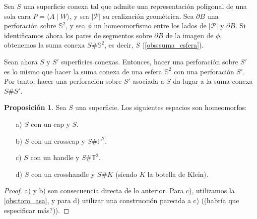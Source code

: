 \documentclass[10pt]{report}
\newcommand{\Esfera}{\mathbb{S}^2}
\newcommand{\Toro}{\mathbb{T}^2}
\newcommand{\Proyectivo}{\mathbb{P}^2}
\theoremstyle{definition}
\newtheorem{prop}[defin]{Proposición}
\begin{document}
Sea $S$ una superficie conexa tal que admite una representación poligonal de una sola cara $P=\langle A\mid W\rangle$, y sea $|\mathcal{P}|$ su realización geométrica. Sea $\partial B$ una perforación sobre $\Esfera$, y sea $\phi$ un homeomorfismo entre los lados de $|\mathcal{P}|$ y $\partial B$. Si identificamos ahora los pares de segmentos sobre $\partial B$ de la imagen de $\phi$, obtenemos la suma conexa $S\# \Esfera$, es decir, $S$ (\autoref{obs:suma_esfera}). 

Sean ahora $S$ y $S'$ superficies conexas. Entonces, hacer una perforación sobre $S'$ es lo mismo que hacer la suma conexa de una esfera $\Esfera$ con una perforación $S'$. Por tanto, hacer una perforación sobre $S'$ asociada a $S$ da lugar a la suma conexa $S\# S'$.
 

\begin{prop}
Sea $S$ una superficie. Los siguientes espacios son homeomorfos:
\begin{itemize}
\item[a)] $S$ con un cap y $S$.
\item[b)] $S$ con un crosscap y $S\# \Proyectivo$.
\item[c)] $S$ con un handle y $S\# \Toro$.
\item[d)] $S$ con un crosshandle y $S\# K$ (siendo $K$ la botella de Klein). 
\end{itemize}
\end{prop}
\begin{proof}
a) y b) son consecuencia directa de lo anterior. Para c), utilizamos la \autoref{obs:toro_asa}, y para d) utilizar una construcción parecida a c) ((habría que especificar más?)).
\end{proof}
\end{document}
